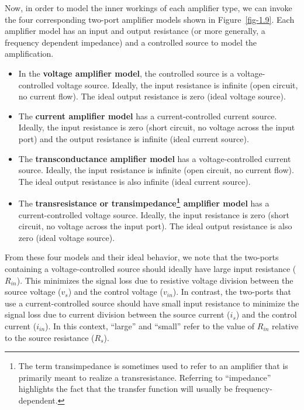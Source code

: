 \documentclass[
  11pt,
  letterpaper,
  abstract]{scrbook}
\begin{document}
Now, in order to model the inner workings of each amplifier type, we can
invoke the four corresponding two-port amplifier models shown in
Figure~\ref{fig-1.9}. Each amplifier model has an input and output
resistance (or more generally, a frequency dependent impedance) and a
controlled source to model the amplification.

\begin{itemize}
\item
  In the \textbf{voltage amplifier model}, the controlled source is a
  voltage-controlled voltage source. Ideally, the input resistance is
  infinite (open circuit, no current flow). The ideal output resistance
  is zero (ideal voltage source).
\item
  The \textbf{current amplifier model} has a current-controlled current
  source. Ideally, the input resistance is zero (short circuit, no
  voltage across the input port) and the output resistance is infinite
  (ideal current source).
\item
  The \textbf{transconductance amplifier model} has a voltage-controlled
  current source. Ideally, the input resistance is infinite (open
  circuit, no current flow). The ideal output resistance is also
  infinite (ideal current source).
\item
  The \textbf{transresistance or transimpedance\footnote{The term
    transimpedance is sometimes used to refer to an amplifier that is
    primarily meant to realize a transresistance. Referring to
    ``impedance'' highlights the fact that the transfer function will
    usually be frequency-dependent.} amplifier model} has a
  current-controlled voltage source. Ideally, the input resistance is
  zero (short circuit, no voltage across the input port). The ideal
  output resistance is also zero (ideal voltage source).
\end{itemize}

From these four models and their ideal behavior, we note that the
two-ports containing a voltage-controlled source should ideally have
large input resistance (\(R_{in}\)). This minimizes the signal loss due
to resistive voltage division between the source voltage (\(v_s\)) and
the control voltage (\(v_{in}\)). In contrast, the two-ports that use a
current-controlled source should have small input resistance to minimize
the signal loss due to current division between the source current
(\(i_s\)) and the control current (\(i_{in}\)). In this context,
``large'' and ``small'' refer to the value of \(R_{in}\) relative to the
source resistance (\(R_s\)).
\end{document}
